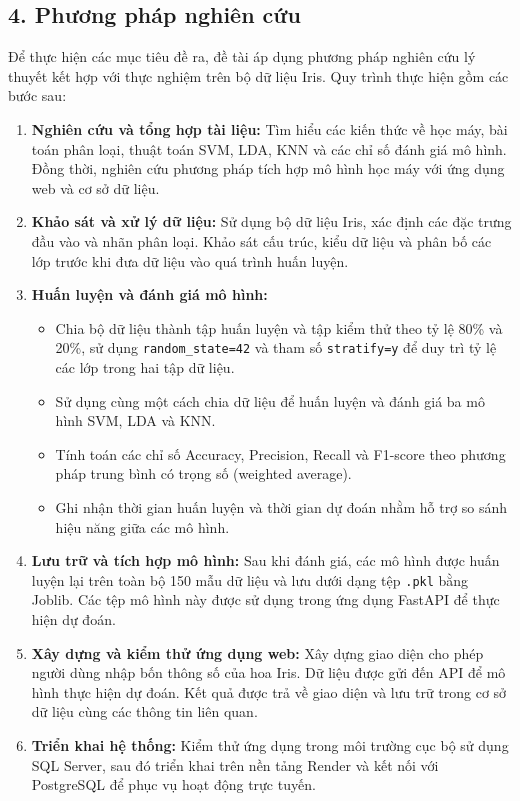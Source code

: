 \documentclass[14pt]{extarticle}
\begin{document}
\subsection*{4. Phương pháp nghiên cứu}

\noindent Để thực hiện các mục tiêu đề ra, đề tài áp dụng phương pháp nghiên cứu lý thuyết kết hợp với thực nghiệm trên bộ dữ liệu Iris. Quy trình thực hiện gồm các bước sau:

\begin{enumerate}[leftmargin=*]
	
	\item \textbf{Nghiên cứu và tổng hợp tài liệu:}
	Tìm hiểu các kiến thức về học máy, bài toán phân loại, thuật toán SVM, LDA, KNN và các chỉ số đánh giá mô hình. Đồng thời, nghiên cứu phương pháp tích hợp mô hình học máy với ứng dụng web và cơ sở dữ liệu.
	
	\item \textbf{Khảo sát và xử lý dữ liệu:}
	Sử dụng bộ dữ liệu Iris, xác định các đặc trưng đầu vào và nhãn phân loại. Khảo sát cấu trúc, kiểu dữ liệu và phân bố các lớp trước khi đưa dữ liệu vào quá trình huấn luyện.
	
	\item \textbf{Huấn luyện và đánh giá mô hình:}
	
	\begin{itemize}
		\item Chia bộ dữ liệu thành tập huấn luyện và tập kiểm thử theo tỷ lệ 80\% và 20\%, sử dụng \texttt{random\_state=42} và tham số \texttt{stratify=y} để duy trì tỷ lệ các lớp trong hai tập dữ liệu.
		
		\item Sử dụng cùng một cách chia dữ liệu để huấn luyện và đánh giá ba mô hình SVM, LDA và KNN.
		
		\item Tính toán các chỉ số Accuracy, Precision, Recall và F1-score theo phương pháp trung bình có trọng số (weighted average).
		
		\item Ghi nhận thời gian huấn luyện và thời gian dự đoán nhằm hỗ trợ so sánh hiệu năng giữa các mô hình.
	\end{itemize}
	
	\item \textbf{Lưu trữ và tích hợp mô hình:}
	Sau khi đánh giá, các mô hình được huấn luyện lại trên toàn bộ 150 mẫu dữ liệu và lưu dưới dạng tệp \texttt{.pkl} bằng Joblib. Các tệp mô hình này được sử dụng trong ứng dụng FastAPI để thực hiện dự đoán.
	
	\item \textbf{Xây dựng và kiểm thử ứng dụng web:}
	Xây dựng giao diện cho phép người dùng nhập bốn thông số của hoa Iris. Dữ liệu được gửi đến API để mô hình thực hiện dự đoán. Kết quả được trả về giao diện và lưu trữ trong cơ sở dữ liệu cùng các thông tin liên quan.
	
	\item \textbf{Triển khai hệ thống:}
	Kiểm thử ứng dụng trong môi trường cục bộ sử dụng SQL Server, sau đó triển khai trên nền tảng Render và kết nối với PostgreSQL để phục vụ hoạt động trực tuyến.
	
\end{enumerate}
\end{document}
